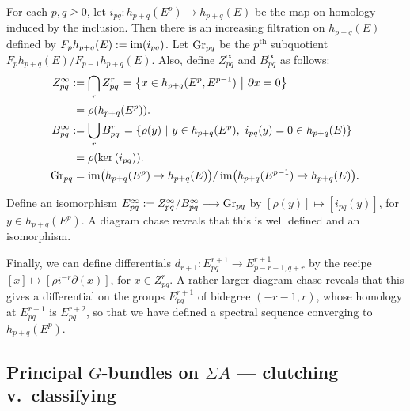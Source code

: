 \documentclass[11pt]{article}
\newcommand{\myheading}[1]
{{\noindent\Large #1}

}
\renewcommand{\myheading}[1]{\subsection{#1}}
\begin{document}
\begin{Leray Serre Hirzebruch SS}
For each $p,q\geq0$, let $i_{pq}:h_{p+q}(E^p)\to h_{p+q}(E)$ be the map on homology induced by the inclusion. Then there is an increasing filtration on $h_{p+q}(E)$ defined by $F_{p}h_{p+q}(E):=\operatorname{im}(i_{pq})$. Let $\textup{Gr}_{pq}$ be the $p^\text{th}$ subquotient $F_{p}h_{p+q}(E)/F_{p-1}h_{p+q}(E)$. Also, define $Z^\infty_{pq}$ and $B^\infty_{pq}$ as follows:
\begin{alignat*}{2}
Z_{pq}^\infty:=&\left.\bigcap_r Z_{pq}^r\right.=\left\{x\in h_{p+q}(E^p,E^{p-1})\ \middle|\ \partial x=0\right\}\\
=&\left.\rho(h_{p+q}(E^p)).\right.\\
B_{pq}^\infty:=&\left.\bigcup_r B_{pq}^r\right.=\left\{\rho(y)\ \middle|\ y\in h_{p+q}(E^p),\ i_{pq}(y)=0\in h_{p+q}(E)\right\}\\
=&\left.\rho(\textup{ker}\, (i_{pq})).\right.\\
\textup{Gr}_{pq}=&\left.\operatorname{im}\bigl(h_{p+q}(E^p)\rightarrow h_{p+q}(E)\bigr)/\operatorname{im}\bigl(h_{p+q}(E^{p-1})\rightarrow h_{p+q}(E)\bigr).\right.
\end{alignat*}

Define an isomorphism $E^\infty_{pq}:= Z_{pq}^\infty/B_{pq}^\infty\longrightarrow \textup{Gr}_{pq}$
by $[\rho(y)]\mapsto[i_{pq}(y)]$, for $y\in h_{p+q}(E^p)$. A diagram chase reveals that this is well defined and an isomorphism.

Finally, we can define differentials $d_{r+1}:E^{r+1}_{pq}\to E^{r+1}_{p-r-1,q+r}$ by the recipe $[x]\mapsto [\rho i^{-r}\partial(x)]$, for $x\in Z_{pq}^{r}$. A rather larger diagram chase reveals that this gives a differential on the groups $E^{r+1}_{pq}$ of bidegree $(-r-1,r)$, whose homology at $E^{r+1}_{pq}$ is $E^{r+2}_{pq}$, so that we have defined a spectral sequence converging to $h_{p+q}(E^p)$.


\end{Leray Serre Hirzebruch SS}
\myheading{Principal \texorpdfstring{$G$}{G}-bundles on \texorpdfstring{$\Sigma A$}{SA} --- clutching v.\ classifying}
\end{document}

